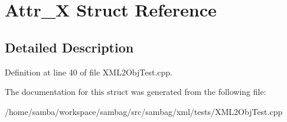 \hypertarget{struct_attr___x}{
\section{Attr\_\-X Struct Reference}
\label{struct_attr___x}
}


\subsection{Detailed Description}


Definition at line 40 of file XML2ObjTest.cpp.



The documentation for this struct was generated from the following file:\begin{DoxyCompactItemize}
\item 
/home/samba/workspace/sambag/src/sambag/xml/tests/XML2ObjTest.cpp\end{DoxyCompactItemize}
